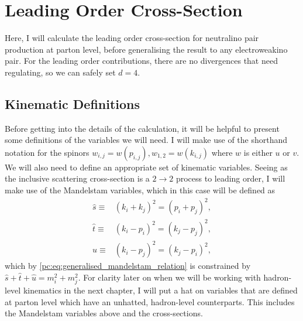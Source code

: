 \documentclass[../main.tex]{subfiles}
\begin{document}




\section{Leading Order Cross-Section}
Here, I will calculate the leading order cross-section for neutralino pair production at parton level, before generalising the result to any electroweakino pair.
For the leading order contributions, there are no divergences that need regulating, so we can safely set \(d=4\).

\subsection{Kinematic Definitions}
Before getting into the details of the calculation, it will be helpful to present some definitions of the variables we will need.
I will make use of the shorthand notation for the spinors \(w_{i,j} = w(p_{i,j}), w_{1,2} = w(k_{i,j})\) where \(w\) is either \(u\) or \(v\).
We will also need to define an appropriate set of kinematic variables.
Seeing as the inclusive scattering cross-section is a \(2 \to 2\) process to leading order, I will make use of the Mandelstam variables, which in this case will be defined as
\begin{subequations}
  \label{pc:eq:mandelstam_LO}
  \begin{align}
    \hat{s} \equiv & (k_i+k_j)^2 = (p_i+p_j)^2, \\
    \hat{t} \equiv & (k_i-p_i)^2 = (k_j-p_j)^2, \\
    \hat{u} \equiv & (k_i-p_j)^2 = (k_j-p_i)^2,
  \end{align}
\end{subequations}
which by \cref{pc:eq:generalised_mandelstam_relation} is constrained by \(\hat{s} + \hat{t} + \hat{u} = m_i^2 + m_j^2\).
For clarity later on when we will be working with hadron-level kinematics in the next chapter, I will put a hat on variables that are defined at parton level which have an unhatted, hadron-level counterparts.
This includes the Mandelstam variables above and the cross-sections.
\end{document}
